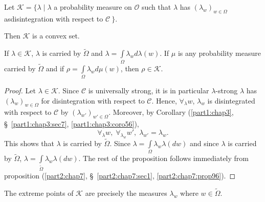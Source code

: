 Let $\mathscr{K} = \{ \lambda \mid \lambda $ a probability measure on
$\mathscr{O}$ such that $\lambda$ has $(\lambda_w)_{w \in \Omega}$
as\pageoriginale disintegration with respect to $\mathscr{C} ~\}$.

Then $\mathscr{K}$ is a convex set.

\begin{proposition}\label{part2:chap7:prop105}
If $\lambda \in \mathscr{K}$, $\lambda$ is carried by $\tilde{\Omega}$
and $\lambda = \int\limits_\Omega \lambda_w d\lambda(w)$. If $\mu$ is
any probability measure carried by $\tilde{\Omega}$ and if $\rho =
\int\limits_\Omega \lambda_wd\mu(w )$, then $\rho \in \mathscr{K}$.
\end{proposition}

\begin{proof}
Let $\lambda \in \mathscr{K}$. Since $\mathscr{C}$ is universally
strong, it is in particular $\lambda$-strong $\lambda$ has
$(\lambda_w)_{w \in \Omega}$ for disintegration with respect to
$\mathscr{C}$. Hence, $\forall_\lambda w$, $\lambda_w$ is
disintegrated with respect to $\mathscr{C}$ by $(\lambda_{w'})_{w' \in
\Omega}$. Moreover, by Corollary (\ref{part1:chap3},
\S\ \ref{part1:chap3:sec7}, \ref{part1:chap3:coro56}), 
$$
\forall_\lambda w, \; \forall_{\lambda_w} w', \; \lambda_{w'} =
\lambda_w. 
$$
This shows that $\lambda $ is carried by $\tilde{\Omega}$. Since
$\lambda = \int\limits_\Omega \lambda_w \lambda(dw)$ and since
$\lambda$ is carried by $\tilde{\Omega}$, $\lambda =
\int\limits_{\tilde{\Omega}} \lambda_w\lambda(dw)$. The rest of the proposition
follows immediately from proposition (\ref{part2:chap7},
\S\ \ref{part2:chap7:sec1}, \ref{part2:chap7:prop96}). 
\end{proof}

\begin{thm}\label{part2:chap7:thm106}
The extreme points of $\mathscr{K}$ are precisely the measures
$\lambda_w$ where $w \in \tilde{\Omega}$.
\end{thm}

